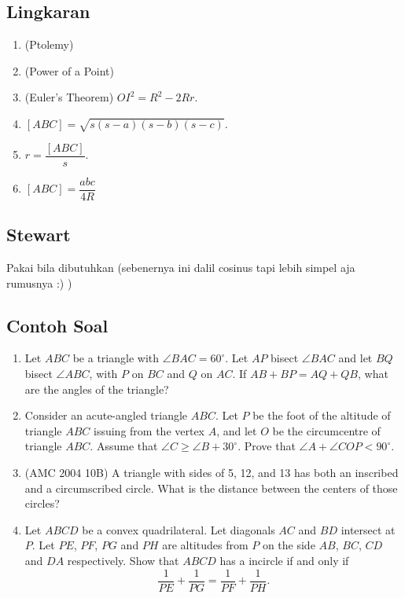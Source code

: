 \documentclass[12pt]{scrartcl}
\begin{document}
\subsection{Lingkaran}
\begin{enumerate}
    \item (Ptolemy)
    \item (Power of a Point)
    \item (Euler's Theorem) $OI^2=R^2-2Rr$.
    \item $[ABC]=\sqrt{s(s-a)(s-b)(s-c)}$.
    \item $r=\dfrac{[ABC]}{s}$.
    \item $[ABC]=\dfrac{abc}{4R}$
\end{enumerate}

\subsection{Stewart}
Pakai bila dibutuhkan (sebenernya ini dalil cosinus tapi lebih simpel aja rumusnya :) )

\subsection{Contoh Soal}
\begin{enumerate}
    \item Let $ABC$ be a triangle with $\angle BAC = 60^\circ$. Let $AP$ bisect $\angle BAC$ and let $BQ$ bisect $\angle ABC$, with $P$ on $BC$ and $Q$ on $AC$. If $AB + BP = AQ + QB$, what are the angles of the triangle?

    \item Consider an acute-angled triangle $ABC$. Let $P$ be the foot of the altitude of triangle $ABC$ issuing from the vertex $A$, and let $O$ be the circumcentre of triangle $ABC$. Assume that $\angle C \geq \angle B + 30^\circ$. Prove that $\angle A + \angle COP < 90^\circ$.

    \item (AMC 2004 10B) A triangle with sides of 5, 12, and 13 has both an inscribed and a circumscribed circle. What is the distance between the centers of those circles?

    \item Let $ABCD$ be a convex quadrilateral. Let diagonals $AC$ and $BD$ intersect at $P$. Let $PE$, $PF$, $PG$ and $PH$ are altitudes from $P$ on the side $AB$, $BC$, $CD$ and $DA$ respectively. Show that $ABCD$ has a incircle if and only if
    $$\dfrac{1}{PE}+\dfrac{1}{PG}=\dfrac{1}{PF}+\dfrac{1}{PH}.$$
\end{enumerate}
\end{document}
